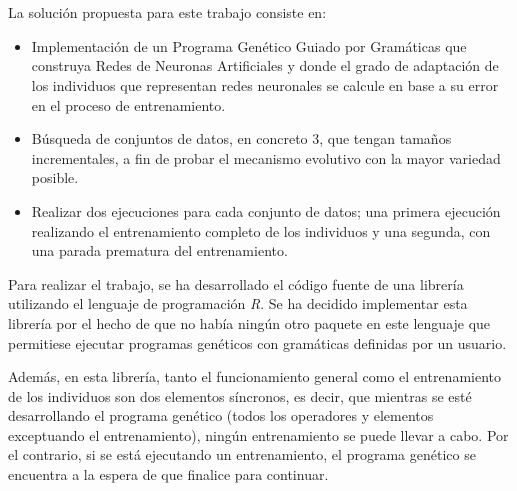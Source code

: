\documentclass[spanish,a4paper,12pt,twoside]{report}
\begin{document}
  \chapter*{\vspace{-3cm}{\LARGE 5. Solución propuesta}}
  \setcounter{figure}{15}
  \vspace{-1cm}
  La solución propuesta para este trabajo consiste en: \par
  \begin{itemize}
    \item Implementación de un Programa Genético Guiado por Gramáticas que construya Redes de Neuronas Artificiales y donde el grado de adaptación de los individuos que representan redes neuronales se calcule en base a su error en el proceso de entrenamiento.
    \item Búsqueda de conjuntos de datos, en concreto 3, que tengan tamaños incrementales, a fin de probar el mecanismo evolutivo con la mayor variedad posible.
    \item Realizar dos ejecuciones para cada conjunto de datos; una primera ejecución realizando el entrenamiento completo de los individuos y una segunda, con una parada prematura del entrenamiento.
  \end{itemize} \par
  Para realizar el trabajo, se ha desarrollado el código fuente de una librería utilizando el lenguaje de programación \emph{R}. Se ha decidido implementar esta librería por el hecho de que no había ningún otro paquete en este lenguaje que permitiese ejecutar programas genéticos con gramáticas definidas por un usuario. \par
  Además, en esta librería, tanto el funcionamiento general como el entrenamiento de los individuos son dos elementos síncronos, es decir, que mientras se esté desarrollando el programa genético (todos los operadores y elementos exceptuando el entrenamiento), ningún entrenamiento se puede llevar a cabo. Por el contrario, si se está ejecutando un entrenamiento, el programa genético se encuentra a la espera de que finalice para continuar. \par
\end{document}
